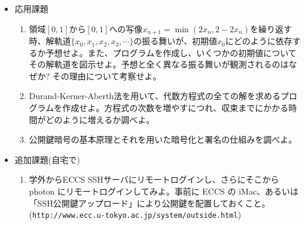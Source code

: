 \documentclass[11pt]{jarticle}
\begin{document}
\begin{itemize}
\item 応用課題
  \begin{enumerate}
  \item 領域$[0,1]$から$[0,1]$への写像$x_{n+1} = \min(2x_n,2-2x_n)$を繰り返す時、解軌道$\{x_0,x_1,x_2,x_3,\cdots\}$の振る舞いが、初期値$x_0$にどのように依存するか予想せよ。また、プログラムを作成し、いくつかの初期値についてその解軌道を図示せよ。予想と全く異なる振る舞いが観測されるのはなぜか? その理由について考察せよ。
  \item Durand-Kerner-Aberth法を用いて、代数方程式の全ての解を求めるプログラムを作成せよ。方程式の次数を増やすにつれ、収束までにかかる時間がどのように増えるか調べよ。
  \item 公開鍵暗号の基本原理とそれを用いた暗号化と署名の仕組みを調べよ。
  \end{enumerate}  

\item 追加課題(自宅で)
  \begin{enumerate}
  \item 学外からECCS SSHサーバにリモートログインし、さらにそこから photon にリモートログインしてみよ。事前に ECCS の iMac、あるいは「SSH公開鍵アップロード」により公開鍵を配置しておくこと。(\verb+http://www.ecc.u-tokyo.ac.jp/system/outside.html+)
  \end{enumerate}

\end{itemize}
\end{document}
